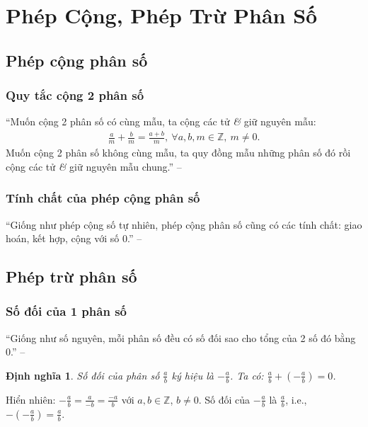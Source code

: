 \documentclass[oneside]{book}
\numberwithin{equation}{section}
\newtheorem{dinhnghia}{Định nghĩa}[section]
\begin{document}

\section{Phép Cộng, Phép Trừ Phân Số}

\subsection{Phép cộng phân số}

\subsubsection{Quy tắc cộng 2 phân số}
``Muốn cộng 2 phân số có cùng mẫu, ta cộng các tử \textit{\&} giữ nguyên mẫu:
\begin{align*}
	\frac{a}{m} + \frac{b}{m} = \frac{a + b}{m},\ \forall a,b,m\in\mathbb{Z},\ m\ne 0.
\end{align*}
Muốn cộng 2 phân số không cùng mẫu, ta quy đồng mẫu những phân số đó rồi cộng các tử \textit{\&} giữ nguyên mẫu chung.'' -- \cite[pp. 34--35]{Thai_Anh_Dat_Ha_Loan_Nam_Quang_Toan_6_tap_2}

\subsubsection{Tính chất của phép cộng phân số}
``Giống như phép cộng số tự nhiên, phép cộng phân số cũng có các tính chất: giao hoán, kết hợp, cộng với số 0.'' -- \cite[pp. 35]{Thai_Anh_Dat_Ha_Loan_Nam_Quang_Toan_6_tap_2}

\subsection{Phép trừ phân số}

\subsubsection{Số đối của 1 phân số}
``Giống như số nguyên, mỗi phân số đều có số đối sao cho tổng của 2 số đó bằng 0.'' -- \cite[pp. 36]{Thai_Anh_Dat_Ha_Loan_Nam_Quang_Toan_6_tap_2}

\begin{dinhnghia}
	\emph{Số đối} của phân số $\frac{a}{b}$ ký hiệu là $-\frac{a}{b}$. Ta có: $\frac{a}{b} + \left(-\frac{a}{b}\right) = 0$.
\end{dinhnghia}
Hiển nhiên: $-\frac{a}{b} = \frac{a}{-b} = \frac{-a}{b}$ với $a,b\in\mathbb{Z}$, $b\ne 0$. Số đối của $-\frac{a}{b}$ là $\frac{a}{b}$, i.e., $-\left(-\frac{a}{b}\right) = \frac{a}{b}$.
\end{document}
